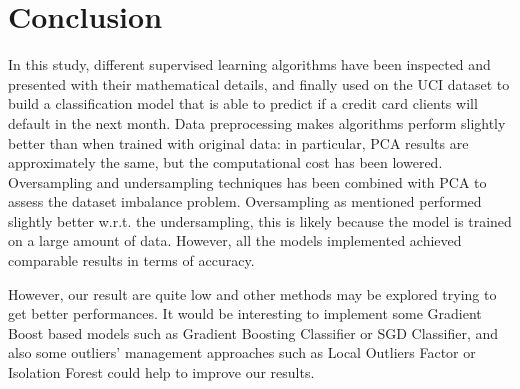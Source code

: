 \documentclass{article}
\begin{document}
\newpage
\section{Conclusion}
In this study, different supervised learning algorithms have been inspected and presented with their mathematical details, and finally used on the UCI dataset to build a classification model that is able to predict if a credit card clients will default in the next month. Data preprocessing makes algorithms perform slightly better than when trained with original data: in particular, PCA results are approximately the same, but the computational cost has been lowered. Oversampling and undersampling techniques has been combined with PCA to assess the dataset imbalance problem. Oversampling as mentioned performed slightly better w.r.t. the undersampling, this is likely because the model is trained on a large amount of data. However, all the models implemented achieved comparable results in terms of accuracy.

However, our result are quite low and other methods may be explored trying to get better performances. It would be interesting to implement some Gradient Boost based models such as Gradient Boosting Classifier or SGD Classifier, and also some outliers' management approaches such as Local Outliers Factor or Isolation Forest could help to improve our results.





\newpage


\end{document}
